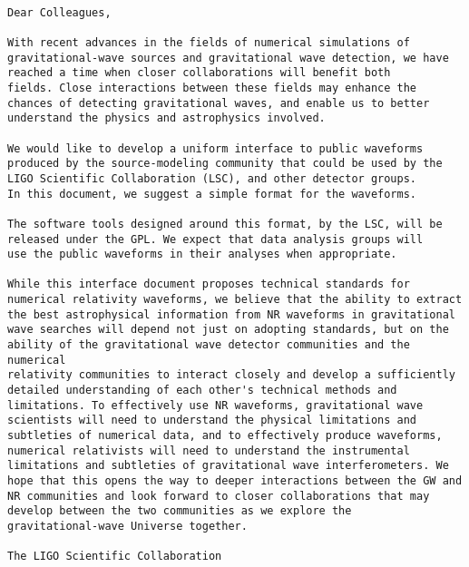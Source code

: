 \documentclass[prd,preprintnumbers,superscriptaddress,eqsecnum]{revtex4}
\numberwithin{equation}{section}
\begin{document}
\begin{verbatim}

Dear Colleagues,

With recent advances in the fields of numerical simulations of
gravitational-wave sources and gravitational wave detection, we have
reached a time when closer collaborations will benefit both
fields. Close interactions between these fields may enhance the
chances of detecting gravitational waves, and enable us to better
understand the physics and astrophysics involved.

We would like to develop a uniform interface to public waveforms
produced by the source-modeling community that could be used by the
LIGO Scientific Collaboration (LSC), and other detector groups.
In this document, we suggest a simple format for the waveforms.

The software tools designed around this format, by the LSC, will be
released under the GPL. We expect that data analysis groups will
use the public waveforms in their analyses when appropriate.

While this interface document proposes technical standards for
numerical relativity waveforms, we believe that the ability to extract
the best astrophysical information from NR waveforms in gravitational
wave searches will depend not just on adopting standards, but on the
ability of the gravitational wave detector communities and the numerical
relativity communities to interact closely and develop a sufficiently
detailed understanding of each other's technical methods and
limitations. To effectively use NR waveforms, gravitational wave
scientists will need to understand the physical limitations and
subtleties of numerical data, and to effectively produce waveforms,
numerical relativists will need to understand the instrumental
limitations and subtleties of gravitational wave interferometers. We
hope that this opens the way to deeper interactions between the GW and
NR communities and look forward to closer collaborations that may
develop between the two communities as we explore the
gravitational-wave Universe together.

The LIGO Scientific Collaboration

\end{verbatim}


\newpage


\maketitle
\end{document}
